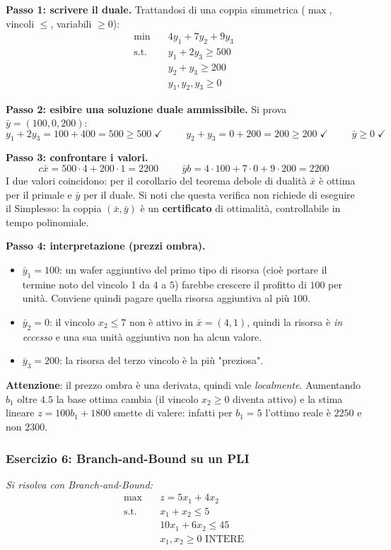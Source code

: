 \documentclass[12pt]{extarticle} %
\begin{document}
\noindent\textbf{Passo 1: scrivere il duale.} Trattandosi di una coppia simmetrica ($\max$, vincoli $\le$, variabili $\ge 0$):
\[
\begin{aligned}
\min \quad & 4y_1 + 7y_2 + 9y_3 \\
\text{s.t.} \quad & y_1 + 2y_3 \ge 500 \\
& y_2 + y_3 \ge 200 \\
& y_1, y_2, y_3 \ge 0
\end{aligned}
\]

\noindent\textbf{Passo 2: esibire una soluzione duale ammissibile.} Si prova $\bar{y} = (100, 0, 200)$:
\[
y_1 + 2y_3 = 100 + 400 = 500 \ge 500 \; \checkmark \hspace{1cm} y_2 + y_3 = 0 + 200 = 200 \ge 200 \; \checkmark \hspace{1cm} \bar{y} \ge 0 \; \checkmark
\]

\noindent\textbf{Passo 3: confrontare i valori.}
\[
c\bar{x} = 500\cdot 4 + 200 \cdot 1 = 2200 \hspace{1cm} \bar{y}b = 4\cdot 100 + 7 \cdot 0 + 9\cdot 200 = 2200
\]
I due valori coincidono: per il corollario del teorema debole di dualità $\bar{x}$ è ottima per il primale e $\bar{y}$ per il duale. Si noti che questa verifica non richiede di eseguire il Simplesso: la coppia $(\bar{x},\bar{y})$ è un \textbf{certificato} di ottimalità, controllabile in tempo polinomiale.

\noindent\textbf{Passo 4: interpretazione (prezzi ombra).}
\begin{itemize}
    \item $\bar{y}_1 = 100$: un wafer aggiuntivo del primo tipo di risorsa (cioè portare il termine noto del vincolo 1 da $4$ a $5$) farebbe crescere il profitto di $100$ per unità. Conviene quindi pagare quella risorsa aggiuntiva al più $100$.
    \item $\bar{y}_2 = 0$: il vincolo $x_2 \le 7$ non è attivo in $\bar{x}=(4,1)$, quindi la risorsa è \textit{in eccesso} e una sua unità aggiuntiva non ha alcun valore.
    \item $\bar{y}_3 = 200$: la risorsa del terzo vincolo è la più "preziosa".
\end{itemize}
\textbf{Attenzione}: il prezzo ombra è una derivata, quindi vale \textit{localmente}. Aumentando $b_1$ oltre $4.5$ la base ottima cambia (il vincolo $x_2 \ge 0$ diventa attivo) e la stima lineare $z = 100b_1 + 1800$ smette di valere: infatti per $b_1 = 5$ l'ottimo reale è $2250$ e non $2300$.

\subsubsection{Esercizio 6: Branch-and-Bound su un PLI}
\textit{Si risolva con Branch-and-Bound:}
\[
\begin{aligned}
\max \quad & z = 5x_1 + 4x_2 \\
\text{s.t.} \quad & x_1 + x_2 \le 5 \\
& 10x_1 + 6x_2 \le 45 \\
& x_1, x_2 \ge 0 \text{ INTERE}
\end{aligned}
\]
\end{document}
